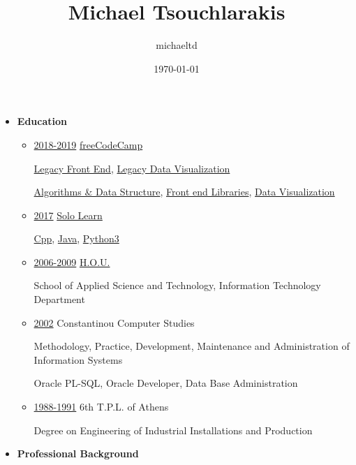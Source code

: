 \documentclass[11pt]{article}
\author{michaeltd}
\date{\today}
\title{Michael Tsouchlarakis}
\begin{document}
\maketitle
\begin{itemize}
\item \textbf{Education}

\begin{itemize}
\item \uline{2018-2019} \href{https://www.freecodecamp.org/michaeltd}{freeCodeCamp}

\href{https://www.freecodecamp.org/certification/michaeltd/legacy-front-end}{Legacy Front End}, \href{https://www.freecodecamp.org/certification/michaeltd/legacy-data-visualization}{Legacy Data Visualization}

\href{https://www.freecodecamp.org/certification/michaeltd/javascript-algorithms-and-data-structures}{Algorithms \& Data Structure}, \href{https://www.freecodecamp.org/certification/michaeltd/front-end-libraries}{Front end Libraries}, \href{https://www.freecodecamp.org/certification/michaeltd/data-visualization}{Data Visualization}

\item \uline{2017} \href{https://www.sololearn.com/Profile/4692870}{Solo Learn}

\href{https://www.sololearn.com/Certificate/1051-4692870/pdf/}{Cpp}, \href{https://www.sololearn.com/Certificate/1068-4692870/pdf/}{Java}, \href{https://www.sololearn.com/Certificate/1073-4692870/pdf/}{Python3}

\item \uline{2006-2009} \href{https://www.eap.gr/en/}{H.O.U.}

School of Applied Science and Technology, Information Technology Department

\item \uline{2002} Constantinou Computer Studies

Methodology, Practice, Development, Maintenance and Administration of Information Systems

Oracle PL-SQL, Oracle Developer, Data Base Administration

\item \uline{1988-1991} 6th T.P.L. of Athens

Degree on Engineering of Industrial Installations and Production
\end{itemize}

\item \textbf{Professional Background}


\end{itemize}
\end{document}
